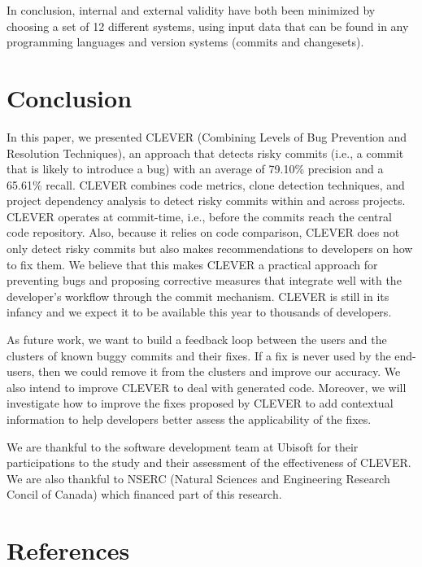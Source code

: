 \documentclass[sigconf]{acmart}
\begin{document}
In conclusion, internal and external validity have both been minimized
by choosing a set of 12 different systems, using input data that can be
found in any programming languages and version systems (commits and
changesets).

\section{Conclusion}\label{sec:conclusion}

In this paper, we presented CLEVER (Combining Levels of Bug Prevention
and Resolution Techniques), an approach that detects risky commits
(i.e., a commit that is likely to introduce a bug) with an average of
79.10\% precision and a 65.61\% recall. CLEVER combines code metrics,
clone detection techniques, and project dependency analysis to detect
risky commits within and across projects. CLEVER operates at
commit-time, i.e., before the commits reach the central code repository.
Also, because it relies on code comparison, CLEVER does not only detect
risky commits but also makes recommendations to developers on how to fix
them. We believe that this makes CLEVER a practical approach for
preventing bugs and proposing corrective measures that integrate well
with the developer's workflow through the commit mechanism. CLEVER is
still in its infancy and we expect it to be available this year to
thousands of developers.

As future work, we want to build a feedback loop between the users and
the clusters of known buggy commits and their fixes. If a fix is never
used by the end-users, then we could remove it from the clusters and
improve our accuracy. We also intend to improve CLEVER to deal with
generated code. Moreover, we will investigate how to improve the fixes
proposed by CLEVER to add contextual information to help developers
better assess the applicability of the fixes.

\begin{acks}
We are thankful to the software development team at  Ubisoft for their participations to the study and their assessment of the effectiveness of CLEVER.
We are also thankful to NSERC (Natural Sciences and Engineering Research Concil of Canada) which financed part of this research.
\end{acks}

\section*{References}
\end{document}
